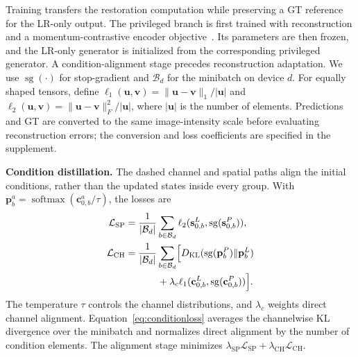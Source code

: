 \documentclass[10pt,journal,letterpaper]{IEEEtran}
\begin{document}
Training transfers the restoration computation while preserving a GT reference for the LR-only output. The privileged branch is first trained with reconstruction and a momentum-contrastive encoder objective~\cite{he2020moco}. Its parameters are then frozen, and the LR-only generator is initialized from the corresponding privileged generator. A condition-alignment stage precedes reconstruction adaptation. We use $\operatorname{sg}(\cdot)$ for stop-gradient and $\mathcal B_d$ for the minibatch on device $d$. For equally shaped tensors, define $\ell_1(\mathbf u,\mathbf v)=\|\mathbf u-\mathbf v\|_1/|\mathbf u|$ and $\ell_2(\mathbf u,\mathbf v)=\|\mathbf u-\mathbf v\|_F^2/|\mathbf u|$, where $|\mathbf u|$ is the number of elements. Predictions and GT are converted to the same image-intensity scale before evaluating reconstruction errors; the conversion and loss coefficients are specified in the supplement.

\noindent\textbf{Condition distillation.}
The dashed channel and spatial paths align the initial conditions, rather than the updated states inside every group. With $\mathbf p_b^a=\operatorname{softmax}(\mathbf c_{0,b}^a/\tau)$, the losses are
\begin{equation}
\begin{aligned}
\mathcal L_{\mathrm{SP}}&=\frac{1}{|\mathcal B_d|}\sum_{b\in\mathcal B_d}
\ell_2(\mathbf s_{0,b}^L,\operatorname{sg}(\mathbf s_{0,b}^P)),\\
\mathcal L_{\mathrm{CH}}&=\frac{1}{|\mathcal B_d|}\sum_{b\in\mathcal B_d}
\Bigl[D_{\mathrm{KL}}(\operatorname{sg}(\mathbf p_b^P)\Vert\mathbf p_b^L)\\
&\hspace{3.3em}+\lambda_c\ell_1(\mathbf c_{0,b}^L,\operatorname{sg}(\mathbf c_{0,b}^P))\Bigr].
\end{aligned}
\label{eq:conditionloss}
\end{equation}
The temperature $\tau$ controls the channel distributions, and $\lambda_c$ weights direct channel alignment. Equation~\eqref{eq:conditionloss} averages the channelwise KL divergence over the minibatch and normalizes direct alignment by the number of condition elements. The alignment stage minimizes $\lambda_{\mathrm{SP}}\mathcal L_{\mathrm{SP}}+\lambda_{\mathrm{CH}}\mathcal L_{\mathrm{CH}}$.
\end{document}
